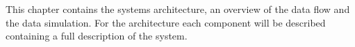This chapter contains the systems architecture, an overview of the data flow and the data simulation.
For the architecture each component will be described containing a full description of the system.
